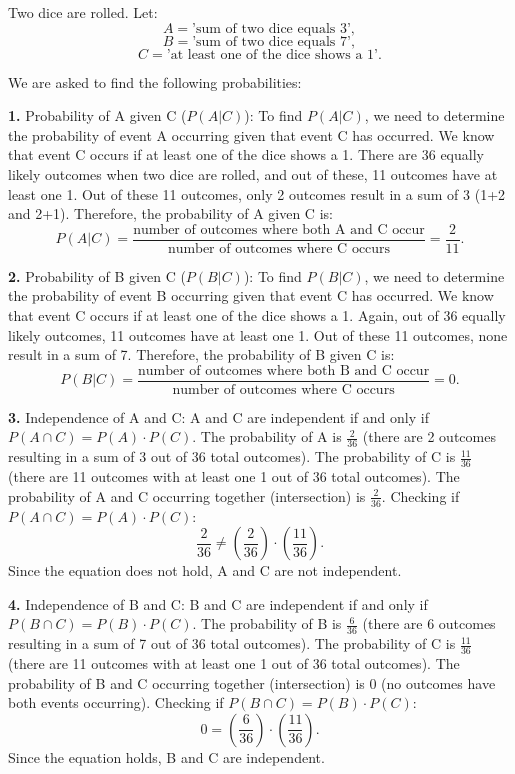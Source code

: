 \documentclass{article}
\begin{document}
Two dice are rolled. Let:
\[A = \text{'sum of two dice equals 3'},\]
\[B = \text{'sum of two dice equals 7'},\]
\[C = \text{'at least one of the dice shows a 1'}.\]

We are asked to find the following probabilities:

\textbf{1.} Probability of A given C (\(P(A|C)\)):
To find \(P(A|C)\), we need to determine the probability of event A occurring given that event C has occurred.
We know that event C occurs if at least one of the dice shows a 1. There are 36 equally likely outcomes when two dice are rolled, and out of these, 11 outcomes have at least one 1.
Out of these 11 outcomes, only 2 outcomes result in a sum of 3 (1+2 and 2+1).
Therefore, the probability of A given C is:
\[P(A|C) = \frac{{\text{{number of outcomes where both A and C occur}}}}{{\text{{number of outcomes where C occurs}}}} = \frac{2}{11}.\]

\textbf{2.} Probability of B given C (\(P(B|C)\)):
To find \(P(B|C)\), we need to determine the probability of event B occurring given that event C has occurred.
We know that event C occurs if at least one of the dice shows a 1. Again, out of 36 equally likely outcomes, 11 outcomes have at least one 1.
Out of these 11 outcomes, none result in a sum of 7.
Therefore, the probability of B given C is:
\[P(B|C) = \frac{{\text{{number of outcomes where both B and C occur}}}}{{\text{{number of outcomes where C occurs}}}} = 0.\]

\textbf{3.} Independence of A and C:
A and C are independent if and only if \(P(A \cap C) = P(A) \cdot P(C)\).
The probability of A is \(\frac{2}{36}\) (there are 2 outcomes resulting in a sum of 3 out of 36 total outcomes).
The probability of C is \(\frac{11}{36}\) (there are 11 outcomes with at least one 1 out of 36 total outcomes).
The probability of A and C occurring together (intersection) is \(\frac{2}{36}\).
Checking if \(P(A \cap C) = P(A) \cdot P(C)\):
\[\frac{2}{36} \neq \left(\frac{2}{36}\right) \cdot \left(\frac{11}{36}\right).\]
Since the equation does not hold, A and C are not independent.

\textbf{4.} Independence of B and C:
B and C are independent if and only if \(P(B \cap C) = P(B) \cdot P(C)\).
The probability of B is \(\frac{6}{36}\) (there are 6 outcomes resulting in a sum of 7 out of 36 total outcomes).
The probability of C is \(\frac{11}{36}\) (there are 11 outcomes with at least one 1 out of 36 total outcomes).
The probability of B and C occurring together (intersection) is 0 (no outcomes have both events occurring).
Checking if \(P(B \cap C) = P(B) \cdot P(C)\):
\[0 = \left(\frac{6}{36}\right) \cdot \left(\frac{11}{36}\right).\]
Since the equation holds, B and C are independent.
\end{document}
